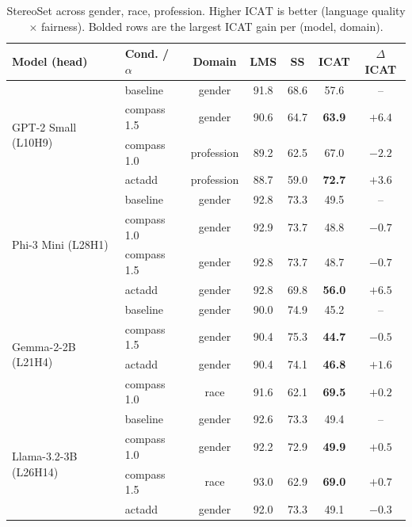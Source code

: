 \begin{table}[h]
\centering
\small
\caption{StereoSet across gender, race, profession. Higher
$\mathrm{ICAT}$ is better (language quality $\times$ fairness).
Bolded rows are the largest ICAT gain per (model, domain).}
\label{tab:stereoset}
\begin{tabular}{llccccc}
\toprule
Model (head) & Cond. / $\alpha$ & Domain & LMS & SS & ICAT & $\Delta$ICAT \\
\midrule
\multirow{4}{*}{GPT-2 Small (L10H9)}
& baseline & gender      & 91.8 & 68.6 & 57.6 & --     \\
& compass 1.5 & gender   & 90.6 & 64.7 & \textbf{63.9} & $+6.4$ \\
& compass 1.0 & profession & 89.2 & 62.5 & 67.0 & $-2.2$ \\
& actadd   & profession  & 88.7 & 59.0 & \textbf{72.7} & $+3.6$ \\
\midrule
\multirow{4}{*}{Phi-3 Mini (L28H1)}
& baseline & gender      & 92.8 & 73.3 & 49.5 & --     \\
& compass 1.0 & gender   & 92.9 & 73.7 & 48.8 & $-0.7$ \\
& compass 1.5 & gender   & 92.8 & 73.7 & 48.7 & $-0.7$ \\
& actadd   & gender      & 92.8 & 69.8 & \textbf{56.0} & $+6.5$ \\
\midrule
\multirow{4}{*}{Gemma-2-2B (L21H4)}
& baseline & gender      & 90.0 & 74.9 & 45.2 & --     \\
& compass 1.5 & gender   & 90.4 & 75.3 & \textbf{44.7} & $-0.5$ \\
& actadd   & gender      & 90.4 & 74.1 & \textbf{46.8} & $+1.6$ \\
& compass 1.0 & race      & 91.6 & 62.1 & \textbf{69.5} & $+0.2$ \\
\midrule
\multirow{4}{*}{Llama-3.2-3B (L26H14)}
& baseline & gender      & 92.6 & 73.3 & 49.4 & --     \\
& compass 1.0 & gender   & 92.2 & 72.9 & \textbf{49.9} & $+0.5$ \\
& compass 1.5 & race     & 93.0 & 62.9 & \textbf{69.0} & $+0.7$ \\
& actadd   & gender      & 92.0 & 73.3 & 49.1 & $-0.3$ \\
\bottomrule
\end{tabular}
\end{table}

